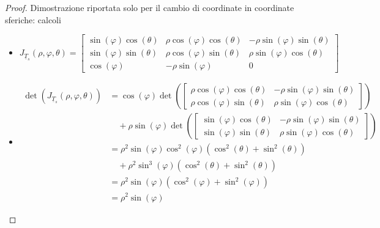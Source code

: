 \documentclass[12pt, a4paper]{article}
\theoremstyle{break}
\begin{document}
\begin{proof} Dimostrazione riportata solo per il cambio di coordinate in
	coordinate sferiche: calcoli
	\begin{itemize}
		\item
			\[
				J_{\underline{T}_s} (\rho, \varphi, \theta) =
				\begin{bmatrix}
					\sin(\varphi) \cos(\theta) & \rho \cos(\varphi) \cos(\theta)
					                           & -\rho \sin(\varphi)
					\sin(\theta)
					\\ \sin(\varphi) \sin(\theta)& \rho \cos(\varphi)
					\sin(\theta)               & \rho \sin(\varphi) \cos(\theta)
					\\ \cos(\varphi) & -\rho \sin(\varphi)              & 0
				\end{bmatrix}
			\]
		\item
			\begin{align*}
				\det(J_{\underline{T}_s} (\rho, \varphi, \theta)) & =
				\cos(\varphi) \det \left(
				\begin{bmatrix}
						\rho \cos(\varphi) \cos(\theta) & -\rho \sin(\varphi)
						\sin(\theta)
						\\ \rho \cos(\varphi) \sin(\theta) & \rho \sin(\varphi)
						\cos(\theta)
					\end{bmatrix}
				\right)
				\\&\quad +
				\rho \sin(\varphi) \det \left(
				\begin{bmatrix}
						\sin(\varphi) \cos(\theta) & -\rho \sin(\varphi)
						\sin(\theta)
						\\ \sin(\varphi) \sin(\theta) & \rho \sin(\varphi)
						\cos(\theta)
					\end{bmatrix}
				\right)
				\\ &= \rho^2 \sin(\varphi) \cos^2(\varphi)
				(\cos^2(\theta) + \sin^2(\theta))
				\\ &\quad + \rho^2 \sin^3(\varphi) (\cos^2(\theta) +
				\sin^2(\theta))
				\\ &= \rho^2 \sin(\varphi) (\cos^2(\varphi) + \sin^2(\varphi))
				\\ &= \rho^2 \sin(\varphi)
			\end{align*}
	\end{itemize}
\end{proof}
\end{document}
